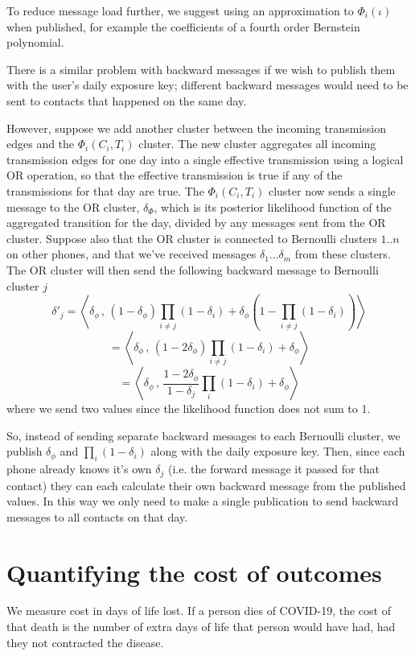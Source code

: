 \documentclass{article}
\begin{document}
To reduce message load further, we suggest using an approximation to $\Phi_i(\iota)$ when published, for example the coefficients of a fourth order Bernstein polynomial.

There is a similar problem with backward messages if we wish to publish them with the user's daily exposure key; different backward messages would need to be sent to contacts that happened on the same day.

However, suppose we add another cluster between the incoming transmission edges and the $\Phi_i(C_i,T_i)$ cluster. The new cluster aggregates all incoming transmission edges for one day into a single effective transmission using a logical OR operation, so that the effective transmission is true if any of the transmissions for that day are true. The $\Phi_i(C_i,T_i)$ cluster now sends a single message to the OR cluster, $\delta_\Phi$, which is its posterior likelihood function of the aggregated transition for the day, divided by any messages sent from the OR cluster. Suppose also that the OR cluster is connected to Bernoulli clusters $1..n$ on other phones, and that we've received messages $\delta_1...\delta_m$ from these clusters. The OR cluster will then send the following backward message to Bernoulli cluster $j$
\[
\delta'_j = \left<\delta_\phi\,,\, (1-\delta_\phi)\prod_{i\ne j}(1-\delta_i) + \delta_\phi(1 - \prod_{i\ne j}(1-\delta_i))\right>
\]
\[
= \left<\delta_\phi\,,\, (1-2\delta_\phi)\prod_{i\ne j}(1-\delta_i) + \delta_\phi \right>
\]
\[
= \left<\delta_\phi\,,\, \frac{1-2\delta_\phi}{1-\delta_j}\prod_{i}(1-\delta_i) + \delta_\phi \right>
\]
where we send two values since the likelihood function does not sum to 1.

So, instead of sending separate backward messages to each Bernoulli cluster, we publish $\delta_\phi$ and $\prod_i (1-\delta_i)$ along with the daily exposure key. Then, since each phone already knows it's own $\delta_j$ (i.e. the forward message it passed for that contact) they can each calculate their own backward message from the published values. In this way we only need to make a single publication to send backward messages to all contacts on that day.

\section{Quantifying the cost of outcomes}

We measure cost in days of life lost. If a person dies of COVID-19, the cost of that death is the number of extra days of life that person would have had, had they not contracted the disease.
\end{document}
